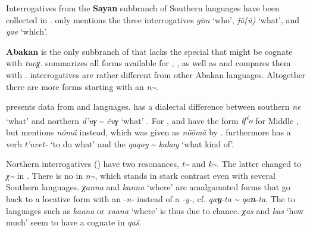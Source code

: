 Interrogatives from the \textbf{Sayan} subbranch of Southern  languages have been collected in . \citet[94]{Ragagnin2011} only mentions the three  interrogatives \textit{gïm} ‘who’, \textit{ǰü(ü)} ‘what’, and \textit{gae} ‘which’.

\textbf{Abakan} is the only subbranch of  that lacks the special  that might be cognate with  \textit{tuoχ}.  summarizes all forms available for , , as well as  and compares them with .  interrogatives are rather different from other Abakan languages. Altogether there are more forms starting with an \textit{n{\textasciitilde}}.



 presents data from  and  languages.  has a dialectal difference between southern \textit{ne} ‘what’ and northern \textit{d’uγ} {\textasciitilde} \textit{čuγ} ‘what’ \citep[15]{Baskakov1958a}. For , \cite{AndersonHarrison2006} and \cite{Harrison2003} have the form \textit{tʃ\textsuperscript{i}}\textit{o} for Middle , but \citet[493]{Birjukovich1997} mentions \textit{nömä} instead, which was given as \textit{nöömä} by \cite{LiYong-Sŏng2008}.  furthermore has a verb \textit{t’uvet-} ‘to do what’ and the   \textit{qaqoy} {\textasciitilde} \textit{kakoy} ‘what kind of’.


Northern  interrogatives () have two resonances, \textit{t{\textasciitilde}} and \textit{k{\textasciitilde}}. The latter changed to \textit{χ{\textasciitilde}} in . There is no  in \textit{n{\textasciitilde}}, which stands in stark contrast even with several Southern  languages.  \textit{χanna} and  \textit{kanna} ‘where’ are amalgamated forms that go back to a locative form with an \textit{-n-} instead of a \textit{-y-}, cf.  \textit{qa}\textbf{\textit{y}}\textit{-ta {\textasciitilde} qa}\textbf{\textit{n}}\textit{-ta}. The  to  languages such as  \textit{kaana} or  \textit{xaana} ‘where’ is thus due to chance.  \textit{χas} and  \textit{kas} ‘how much’ seem to have a cognate in  \textit{qaš}.



